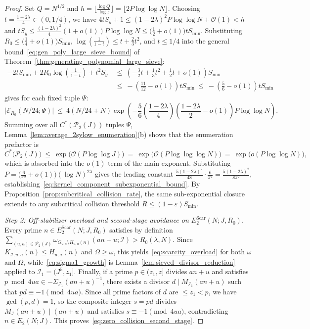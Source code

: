 \documentclass[11pt, a4paper]{article}
\theoremstyle{plain}
\theoremstyle{definition}
\begin{document}
\begin{proof}
Set $Q=N^{1/2}$ and $h=\lfloor\frac{\log Q}{\log z}\rfloor=\lfloor 2P\log\log N\rfloor$. Choosing $t=\frac{1-2\lambda}{4}\in(0,1/4)$, we have $4tS_y+1\le(1-2\lambda)^{2}P\log\log N+\mathcal{O}(1)<h$ and $tS_y\le\frac{(1-2\lambda)^{2}}{4}(1+o(1))P\log\log N\le\big(\frac12+o(1)\big)tS_{\min}$. Substituting $R_0\le\big(\frac14+o(1)\big)S_{\min}$, $\log(\frac{1}{1-t})\le t+\frac23 t^{2}$, and $t\le 1/4$ into the general bound~\eqref{eq:gen_poly_large_sieve_bound} of Theorem~\ref{thm:generating_polynomial_large_sieve}:
\[
\begin{aligned}
-2tS_{\min}+2R_0\log\!\left(\frac{1}{1-t}\right)+t^{2}S_y\ &\le\ \left(-\frac32 t+\frac13 t^{2}+\frac12 t+o(1)\right)S_{\min}\\
&\le\ -\left(\frac{11}{12}-o(1)\right)tS_{\min}\ \le\ -\left(\frac56-o(1)\right)tS_{\min}
\end{aligned}
\]
gives for each fixed tuple $\Psi$:
$$\big|\mathcal{E}_{R_0}(N/24;\Psi)\big|\ \le\ 4(N/24+N)\exp\!\left(-\frac56\left(\frac{1-2\lambda}{4}\right)\left(\frac{1-2\lambda}{2}-o(1)\right)P\log\log N\right).$$
Summing over all $C^{\ast}(\mathcal{P}_2(J))$ tuples $\Psi$, Lemma~\ref{lem:average_2sylow_enumeration}(b) shows that the enumeration prefactor is
$$C^{\ast}\big(\mathcal{P}_2(J)\big)\ \le\ \exp\!\big(\mathcal{O}(P\log\log J)\big)\ =\ \exp\!\big(\mathcal{O}(P\log\log\log N)\big)\ =\ \exp\!\big(o(P\log\log N)\big),$$
which is absorbed into the $o(1)$ term of the main exponent. Substituting $P=\big(\frac{6}{\pi^{2}}+o(1)\big)(\log N)^{2\lambda}$ gives the leading constant $\frac{5(1-2\lambda)^{2}}{48}\cdot\frac{6}{\pi^{2}}=\frac{5(1-2\lambda)^{2}}{8\pi^{2}}$, establishing~\eqref{eq:kernel_component_subexponential_bound}. By Proposition~\ref{prop:subcritical_collision_rate}, the same sub-exponential closure extends to any subcritical collision threshold $R\le(1-\varepsilon)S_{\min}$.

\medskip\noindent\emph{Step 2: Off-stabilizer overload and second-stage avoidance on $E_2^{\mathrm{Scar}}(N;J,R_0)$.}
Every prime $n\in E_2^{\mathrm{Scar}}(N;J,R_0)$ satisfies by definition $\sum_{(u,a)\in\mathcal{P}_2(J)}\omega_{G_{u,a}\setminus H_{u,a}(n)}(an+u;\mathcal{I})>R_0(\lambda,N)$. Since $K_{\mathcal{I},u,a}(n)\le H_{u,a}(n)$ and $\Omega\ge\omega$, this yields~\eqref{eq:scarcity_overload} for both $\omega$ and $\Omega$, while~\eqref{eq:sigma1_growth} is Lemma~\ref{lem:sieved_divisor_reduction} applied to $\mathcal{I}_1=(J^{5},z_1]$. Finally, if a prime $p\in(z_1,z]$ divides $an+u$ and satisfies $p\bmod 4ua\in-\Sigma_{\mathcal{I}_1}(an+u)^{-1}$, there exists a divisor $d\mid M_{\mathcal{I}_1}(an+u)$ such that $pd\equiv-1\pmod{4ua}$. Since all prime factors of $d$ are $\le z_1<p$, we have $\gcd(p,d)=1$, so the composite integer $s=pd$ divides $M_{\mathcal{I}}(an+u)\mid(an+u)$ and satisfies $s\equiv-1\pmod{4ua}$, contradicting $n\in E_2(N;J)$. This proves~\eqref{eq:zero_collision_second_stage}.
\end{proof}
\end{document}
